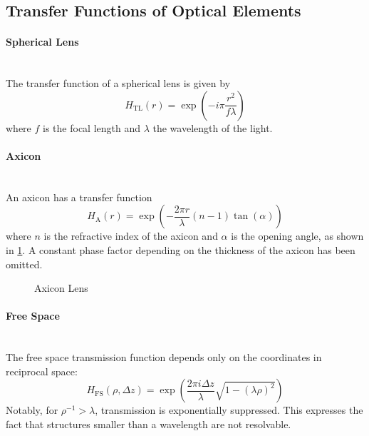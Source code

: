 \subsection{Transfer Functions of Optical Elements}
\paragraph{Spherical Lens} ~\\
The transfer function of a spherical lens is given by
\begin{equation*}
    H_\text{TL}(r) = \exp\!\left(-i\pi\frac{r^2}{f\lambda}\right)
\end{equation*}
where $f$ is the focal length and $\lambda$ the wavelength of the light.

\paragraph{Axicon} ~\\
An axicon has a transfer function
\begin{equation*}
    H_\text{A}(r) = \exp\!\left(-\frac{2\pi r}{\lambda}(n - 1)\tan(\alpha)\right)
\end{equation*}
where $n$ is the refractive index of the axicon and $\alpha$ is the opening angle, as shown in \cref{fig:axicon}. A constant phase factor depending on the thickness of the axicon has been omitted.
\begin{figure}[htbp]
    \centering
    
    \caption{Axicon Lens}
    \label{fig:axicon}
\end{figure}

\paragraph{Free Space} ~\\
The free space transmission function depends only on the coordinates in reciprocal space:
\begin{equation}
    H_\text{FS}(\rho, \Delta z) = \exp\!\left(\frac{2\pi i \Delta z}{\lambda}\sqrt{1 - (\lambda \rho)^2}\right)
\end{equation}
Notably, for $\rho^{-1} > \lambda$, transmission is exponentially suppressed. This expresses the fact that structures smaller than a wavelength are not resolvable.


